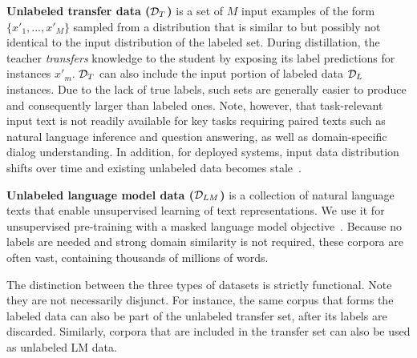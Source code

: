 %
\textbf{Unlabeled transfer data ($\mathcal{D}_{T}$)} is a set of $M$ input examples of the form $\{x'_1, ..., x'_M\}$ sampled from a distribution that is similar to but possibly not identical to the input distribution of the labeled set. During distillation, the teacher \emph{transfers} knowledge to the student by exposing its label predictions for instances $x'_m$. $\mathcal{D}_{T}$ can also include the input portion of labeled data $\mathcal{D}_{L}$ instances. Due to the lack of true labels, such sets are generally easier to produce and consequently larger than labeled ones. Note, however, that task-relevant input text is not readily available for key tasks requiring paired texts such as natural language inference and question answering, as well as domain-specific dialog understanding. In addition, for deployed systems, input data distribution shifts over time  and existing unlabeled data becomes stale~\citep{kim-etal-2017-adversarial}.

\textbf{Unlabeled language model data ($\mathcal{D}_{LM}$)} is a collection of natural language texts that enable unsupervised learning of text representations. We use it for unsupervised pre-training with a masked language model objective~\citep{bert}. Because no labels are needed and strong domain similarity is not required, these corpora are often  vast, containing thousands of millions of words.

The distinction between the three types of datasets is strictly functional. Note they are not necessarily disjunct. For instance, the same corpus that forms the labeled data can also be part of the unlabeled transfer set, after its labels are discarded. Similarly, corpora that are included in the transfer set can also be used as unlabeled LM data.

